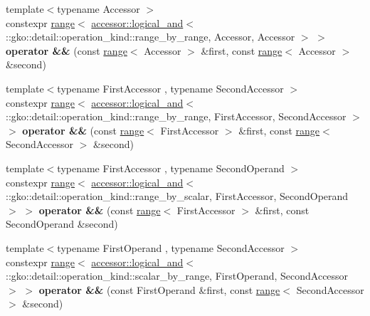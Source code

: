 \begin{DoxyCompactItemize}
\item 
\mbox{\label{namespacegko_a23c09e269456c3664bdf93553e758ba5}} 
{\footnotesize template$<$typename Accessor $>$ }\\constexpr \hyperlink{classgko_1_1range}{range}$<$ \hyperlink{structgko_1_1accessor_1_1logical__and}{accessor\+::logical\+\_\+and}$<$ \+::gko\+::detail\+::operation\+\_\+kind\+::range\+\_\+by\+\_\+range, Accessor, Accessor $>$ $>$ {\bfseries operator \&\&} (const \hyperlink{classgko_1_1range}{range}$<$ Accessor $>$ \&first, const \hyperlink{classgko_1_1range}{range}$<$ Accessor $>$ \&second)
\item 
\mbox{\label{namespacegko_a2103d496963d4da9e264ff1e7440968a}} 
{\footnotesize template$<$typename First\+Accessor , typename Second\+Accessor $>$ }\\constexpr \hyperlink{classgko_1_1range}{range}$<$ \hyperlink{structgko_1_1accessor_1_1logical__and}{accessor\+::logical\+\_\+and}$<$ \+::gko\+::detail\+::operation\+\_\+kind\+::range\+\_\+by\+\_\+range, First\+Accessor, Second\+Accessor $>$ $>$ {\bfseries operator \&\&} (const \hyperlink{classgko_1_1range}{range}$<$ First\+Accessor $>$ \&first, const \hyperlink{classgko_1_1range}{range}$<$ Second\+Accessor $>$ \&second)
\item 
\mbox{\label{namespacegko_a0a6d32f6862dc99898c3a4fdb26ca654}} 
{\footnotesize template$<$typename First\+Accessor , typename Second\+Operand $>$ }\\constexpr \hyperlink{classgko_1_1range}{range}$<$ \hyperlink{structgko_1_1accessor_1_1logical__and}{accessor\+::logical\+\_\+and}$<$ \+::gko\+::detail\+::operation\+\_\+kind\+::range\+\_\+by\+\_\+scalar, First\+Accessor, Second\+Operand $>$ $>$ {\bfseries operator \&\&} (const \hyperlink{classgko_1_1range}{range}$<$ First\+Accessor $>$ \&first, const Second\+Operand \&second)
\item 
\mbox{\label{namespacegko_a0cd6b64fc7c55504465571a46638902c}} 
{\footnotesize template$<$typename First\+Operand , typename Second\+Accessor $>$ }\\constexpr \hyperlink{classgko_1_1range}{range}$<$ \hyperlink{structgko_1_1accessor_1_1logical__and}{accessor\+::logical\+\_\+and}$<$ \+::gko\+::detail\+::operation\+\_\+kind\+::scalar\+\_\+by\+\_\+range, First\+Operand, Second\+Accessor $>$ $>$ {\bfseries operator \&\&} (const First\+Operand \&first, const \hyperlink{classgko_1_1range}{range}$<$ Second\+Accessor $>$ \&second)

\end{DoxyCompactItemize}
